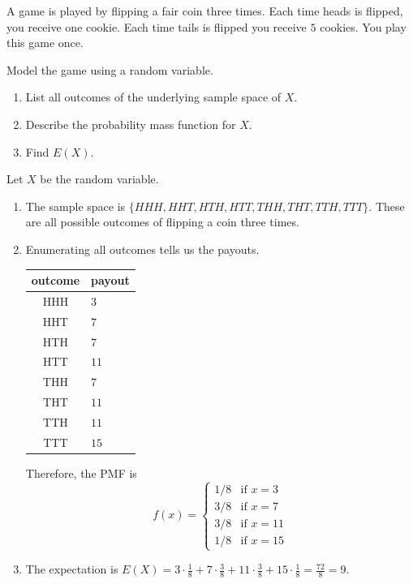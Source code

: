 \documentclass[../main.tex]{subfiles}
\begin{document}
\begin{exercise}
  A game is played by flipping a fair coin three times. Each time heads is flipped, you receive one cookie. Each time tails is flipped you receive \(5\) cookies. You play this game once.

  Model the game using a random variable.

  \begin{enumerate}
    \item List all outcomes of the underlying sample space of \(X\).
    \item Describe the probability mass function for \(X\).
    \item Find \(E(X)\).
  \end{enumerate}

  \begin{solution}
    Let \(X\) be the random variable.

    \begin{enumerate}
      \item The sample space is \(\{HHH, HHT, HTH, HTT, THH, THT, TTH, TTT\}\). These are all possible outcomes of flipping a coin three times.
      \item Enumerating all outcomes tells us the payouts.

        \begin{tabular}{c|l}
          outcome & payout \\\midrule
          HHH & \(3\) \\\midrule
          HHT & \(7\) \\\midrule
          HTH & \(7\) \\\midrule
          HTT & \(11\) \\\midrule
          THH & \(7\)  \\\midrule
          THT & \(11\) \\\midrule
          TTH & \(11\) \\\midrule
          TTT & \(15\) 
        \end{tabular}

        Therefore, the PMF is
        \[
          f(x) = 
          \begin{cases}
            1/8 & \text{if } x = 3 \\
            3/8 & \text{if } x = 7 \\
            3/8 & \text{if } x = 11 \\
            1/8 & \text{if } x = 15
          \end{cases}
        \]

      \item The expectation is \(E(X) = 3 \cdot \frac{1}{8} + 7 \cdot \frac{3}{8} + 11 \cdot \frac{3}{8} + 15 \cdot \frac{1}{8} = \frac{72}{8} = 9\).
    \end{enumerate}

  \end{solution}
\end{exercise}
\end{document}
